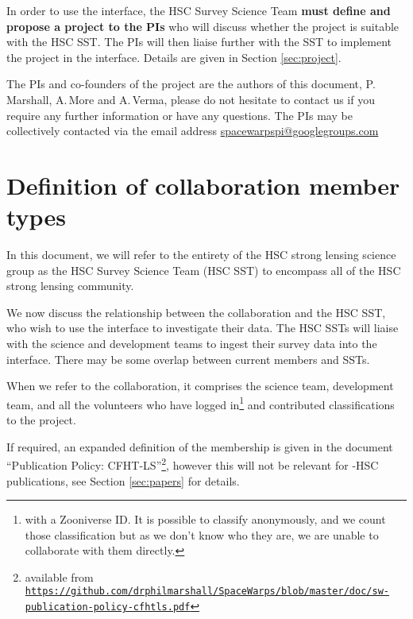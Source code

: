 \documentclass[a4paper,twocolumn]{article}
\begin{document}
In order to use the \SW interface, the HSC Survey Science Team
\textbf{must define and propose a project to the \SW PIs} who will
discuss whether the project is suitable with the HSC SST. The \SW PIs will
then liaise further with the SST to implement the project in the \SW
interface. Details are given in Section \ref{sec:project}.

\vspace{4mm} The PIs  and co-founders of the \SW project are the authors of this
document, P.\,Marshall, A.\,More and A.\,Verma, please do not hesitate
to contact us if you require any further information or have any
questions. The PIs may be collectively contacted via the email address
\href{mailto:spacewarpspi@googlegroups.com}{spacewarpspi@googlegroups.com}




\section{Definition of collaboration member types}
\label{sec:members}

In this document, we will refer to the entirety of the HSC strong
lensing science group as the HSC Survey Science Team (HSC SST) to
encompass all of the HSC strong lensing community.

We now discuss the relationship between the \SW collaboration and the
HSC SST, who wish to use the \SW interface to investigate their
data. The HSC SSTs will liaise with the \SW science and development
teams to ingest their survey data into the \SW interface. There may be
some overlap between current \SW members and SSTs. 

When we refer to the \SW collaboration, it comprises the \SW science
team, \SW development team, and all the volunteers who have logged
in\footnote{with a Zooniverse ID. It is possible to classify
  anonymously, and we count those classification but as we don't know
  who they are, we are unable to collaborate with them directly.} and
contributed classifications to the project.

If required, an expanded definition of the \SW membership is given in
the document ``\SW Publication Policy: CFHT-LS''\footnote{available
  from
  \texttt{\url{https://github.com/drphilmarshall/SpaceWarps/blob/master/doc/sw-publication-policy-cfhtls.pdf}}},
however this will not be relevant for \SW-HSC publications, see
Section \ref{sec:papers} for details.
\end{document}
